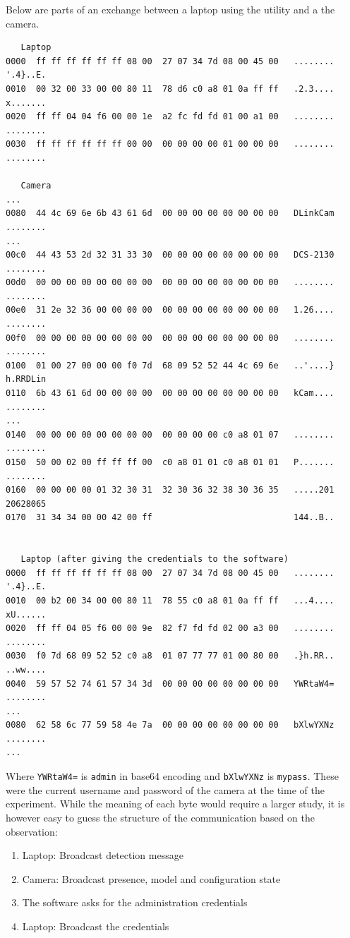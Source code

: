 Below are parts of an exchange between a laptop using the utility and a the camera.

{\small
\begin{verbatim}
   Laptop
0000  ff ff ff ff ff ff 08 00  27 07 34 7d 08 00 45 00   ........ '.4}..E.
0010  00 32 00 33 00 00 80 11  78 d6 c0 a8 01 0a ff ff   .2.3.... x.......
0020  ff ff 04 04 f6 00 00 1e  a2 fc fd fd 01 00 a1 00   ........ ........
0030  ff ff ff ff ff ff 00 00  00 00 00 00 01 00 00 00   ........ ........

   Camera
...
0080  44 4c 69 6e 6b 43 61 6d  00 00 00 00 00 00 00 00   DLinkCam ........
...
00c0  44 43 53 2d 32 31 33 30  00 00 00 00 00 00 00 00   DCS-2130 ........
00d0  00 00 00 00 00 00 00 00  00 00 00 00 00 00 00 00   ........ ........
00e0  31 2e 32 36 00 00 00 00  00 00 00 00 00 00 00 00   1.26.... ........
00f0  00 00 00 00 00 00 00 00  00 00 00 00 00 00 00 00   ........ ........
0100  01 00 27 00 00 00 f0 7d  68 09 52 52 44 4c 69 6e   ..'....} h.RRDLin
0110  6b 43 61 6d 00 00 00 00  00 00 00 00 00 00 00 00   kCam.... ........
...
0140  00 00 00 00 00 00 00 00  00 00 00 00 c0 a8 01 07   ........ ........
0150  50 00 02 00 ff ff ff 00  c0 a8 01 01 c0 a8 01 01   P....... ........
0160  00 00 00 00 01 32 30 31  32 30 36 32 38 30 36 35   .....201 20628065
0170  31 34 34 00 00 42 00 ff                            144..B..         


   Laptop (after giving the credentials to the software)
0000  ff ff ff ff ff ff 08 00  27 07 34 7d 08 00 45 00   ........ '.4}..E.
0010  00 b2 00 34 00 00 80 11  78 55 c0 a8 01 0a ff ff   ...4.... xU......
0020  ff ff 04 05 f6 00 00 9e  82 f7 fd fd 02 00 a3 00   ........ ........
0030  f0 7d 68 09 52 52 c0 a8  01 07 77 77 01 00 80 00   .}h.RR.. ..ww....
0040  59 57 52 74 61 57 34 3d  00 00 00 00 00 00 00 00   YWRtaW4= ........
...
0080  62 58 6c 77 59 58 4e 7a  00 00 00 00 00 00 00 00   bXlwYXNz ........
...
\end{verbatim}
}

Where \texttt{YWRtaW4=} is \texttt{admin} in base64 encoding and \texttt{bXlwYXNz} is \texttt{mypass}.
These were the current username and password of the camera at the time of the experiment.
While the meaning of each byte would require a larger study, it is however easy to guess the structure of the communication based on the observation:

\begin{enumerate}
\item Laptop: Broadcast detection message
\item Camera: Broadcast presence, model and configuration state
\item The software asks for the administration credentials
\item Laptop: Broadcast the credentials
\end{enumerate}


